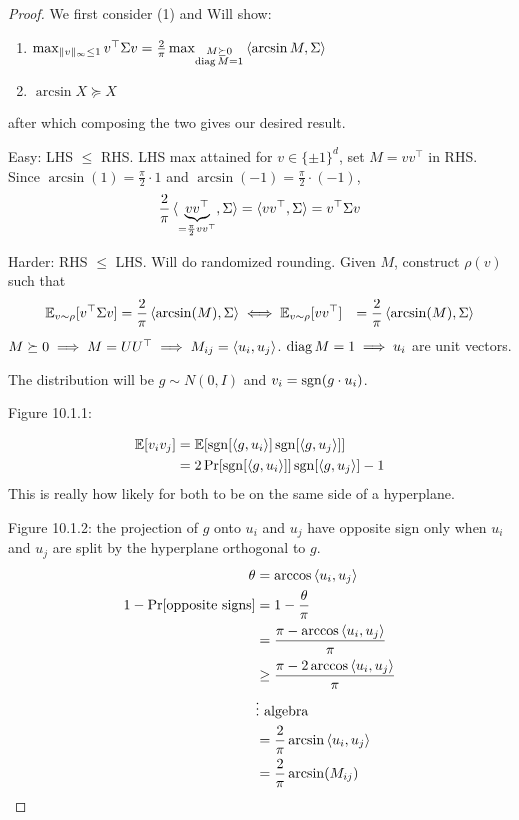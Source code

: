 \begin{proof}
    We first consider (1) and Will show:
    \begin{enumerate}
        \item $\max_{\|v\|_\infty \leq 1} v^\top \Sigma v = \frac{2}{\pi} \max_{\substack{M \succeq 0 \\ \operatorname{diag} M = 1}} \braket{\arcsin M, \Sigma}$
        \item $\arcsin X \succeq X$
    \end{enumerate}
    after which composing the two gives our desired result.

    Easy: LHS $\leq$ RHS. LHS max attained for $v \in \{\pm 1\}^d$, set
    $M = v v^\top$ in RHS.
    Since $\arcsin(1) = \frac{\pi}{2} \cdot 1$ and
    $\arcsin(-1)=\frac{\pi}{2} \cdot (-1)$,
    \begin{align}
        \frac{2}{\pi} \braket{\underbrace{v v^\top}_{= \frac{\pi}{2} v v^\top}, \Sigma}
        = \braket{v v^\top, \Sigma} = v^\top \Sigma v
    \end{align}

    Harder: RHS $\leq$ LHS. Will do randomized rounding.
    Given $M$, construct $\rho(v)$ such that
    \begin{align}
        \mathbb{E}_{v \sim \rho} [v^\top \Sigma v] &= \frac{2}{\pi} \braket{\arcsin(M), \Sigma}
        \iff \mathbb{E}_{v \sim \rho} [v v^\top] &= \frac{2}{\pi} \braket{\arcsin(M), \Sigma}
    \end{align}
    $M \succeq 0 \implies M = U U^\top \implies M_{ij} = \braket{u_i, u_j}$.
    $\operatorname{diag} M = 1 \implies u_i$ are unit vectors.

    The distribution will be $g \sim N(0, I)$ and $v_i = \operatorname{sgn}(g \cdot u_i)$.

    Figure 10.1.1:

    \begin{align}
        \mathbb{E}[v_i v_j]
        &= \mathbb{E}[\operatorname{sgn}[\braket{g, u_i}] \operatorname{sgn}[\braket{g, u_j}]] \\
        &= 2 \Pr[\operatorname{sgn}[\braket{g, u_i}]] \operatorname{sgn}[\braket{g, u_j}] - 1
    \end{align}
    This is really how likely for both to be on the same side of a hyperplane.

    Figure 10.1.2: the projection of $g$ onto $u_i$ and $u_j$ have opposite
    sign only when $u_i$ and $u_j$ are split by the hyperplane orthogonal to $g$.
    \begin{align}
        \theta &= \arccos \braket{u_i, u_j} \\
        1 - \Pr[\text{opposite signs}]
        &= 1 - \frac{\theta}{\pi} \\
        &= \frac{\pi - \arccos \braket{u_i, u_j}}{\pi} \\
        &\geq \frac{\pi - 2 \arccos \braket{u_i, u_j}}{\pi} \\
        &\vdots \text{ algebra}\\
        &= \frac{2}{\pi} \arcsin \braket{u_i, u_j} \\
        &= \frac{2}{\pi} \arcsin(M_{ij})
    \end{align}


\end{proof}
